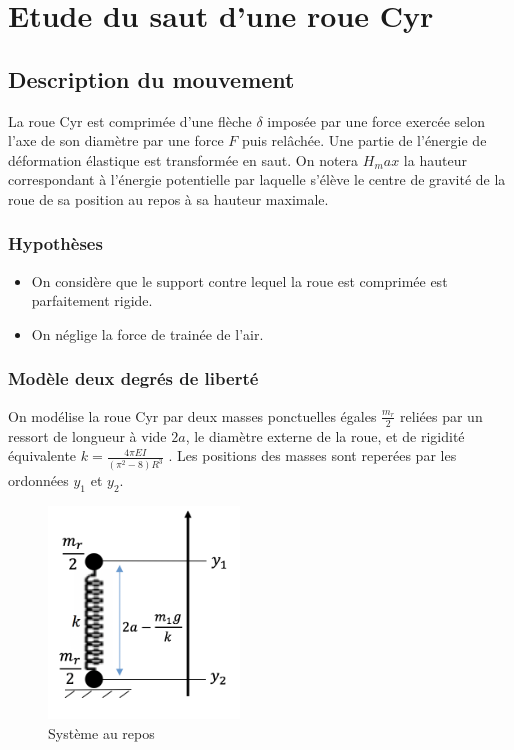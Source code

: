 \section{Etude du saut d'une roue Cyr}
\subsection{Description du mouvement}
La roue Cyr est comprimée d'une flèche $\delta$ imposée par une force exercée selon l'axe de son diamètre par une force $F$ puis relâchée. Une partie de l'énergie de déformation élastique est transformée en saut. On notera $H_max$ la hauteur correspondant à l'énergie potentielle par laquelle s'élève le centre de gravité de la roue de sa position au repos à sa hauteur maximale.


\subsubsection{Hypothèses}
\begin{itemize}
    \item On considère que le support contre lequel la roue est comprimée est parfaitement rigide.
    \item On néglige la force de trainée de l'air.
\end{itemize}

\subsubsection{Modèle deux degrés de liberté}
On modélise la roue Cyr par deux masses ponctuelles égales $\frac{m_r}{2}$ reliées par un ressort de longueur à vide $2a$, le diamètre externe de la roue, et de rigidité équivalente $k=\frac{4\pi EI}{(\pi^2 -8)R^3}$ \cite{yangkim}. Les positions des masses sont reperées par les ordonnées $y_1$ et $y_2$.

\begin{figure}[htb]
\centering
\includegraphics[width=2in]{images_2ddl/repos.png}
\caption{Système au repos}
\label{fig:repos}
\end{figure}

